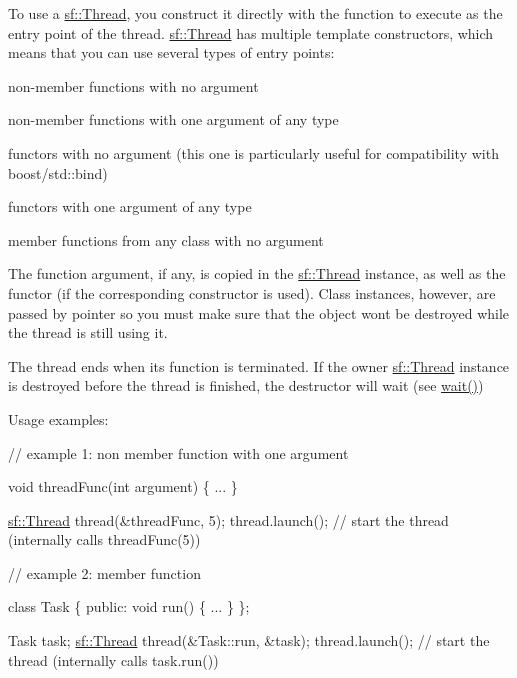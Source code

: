 To use a \hyperlink{classsf_1_1_thread}{sf\+::\+Thread}, you construct it directly with the function to execute as the entry point of the thread. \hyperlink{classsf_1_1_thread}{sf\+::\+Thread} has multiple template constructors, which means that you can use several types of entry points\+: \begin{DoxyItemize}
\item non-\/member functions with no argument \item non-\/member functions with one argument of any type \item functors with no argument (this one is particularly useful for compatibility with boost/std\+:\+:bind) \item functors with one argument of any type \item member functions from any class with no argument\end{DoxyItemize}
The function argument, if any, is copied in the \hyperlink{classsf_1_1_thread}{sf\+::\+Thread} instance, as well as the functor (if the corresponding constructor is used). Class instances, however, are passed by pointer so you must make sure that the object won\textquotesingle{}t be destroyed while the thread is still using it.

The thread ends when its function is terminated. If the owner \hyperlink{classsf_1_1_thread}{sf\+::\+Thread} instance is destroyed before the thread is finished, the destructor will wait (see \hyperlink{classsf_1_1_thread_a724b1f94c2d54f84280f2f78bde95fa0}{wait()})

Usage examples\+: 
\begin{DoxyCode}
\textcolor{comment}{// example 1: non member function with one argument}

\textcolor{keywordtype}{void} threadFunc(\textcolor{keywordtype}{int} argument)
\{
    ...
\}

\hyperlink{classsf_1_1_thread}{sf::Thread} thread(&threadFunc, 5);
thread.launch(); \textcolor{comment}{// start the thread (internally calls threadFunc(5))}
\end{DoxyCode}



\begin{DoxyCode}
\textcolor{comment}{// example 2: member function}

\textcolor{keyword}{class }Task
\{
\textcolor{keyword}{public}:
    \textcolor{keywordtype}{void} run()
    \{
        ...
    \}
\};

Task task;
\hyperlink{classsf_1_1_thread}{sf::Thread} thread(&Task::run, &task);
thread.launch(); \textcolor{comment}{// start the thread (internally calls task.run())}
\end{DoxyCode}



